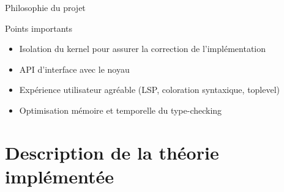 \documentclass[12pt, aspectratio=169]{beamer}
\begin{document}
        \begin{frame}{Philosophie du projet}
            
            \begin{alertblock}{Points importants}
                
                \begin{itemize}
                    \item Isolation du kernel pour assurer la correction de l'implémentation \pause
                    \item API d'interface avec le noyau \pause
                    \item Expérience utilisateur agréable (LSP, coloration syntaxique, toplevel) \pause
                    \item Optimisation mémoire et temporelle du type-checking
                \end{itemize}

            \end{alertblock}

        \end{frame}

    \section{Description de la théorie implémentée}
\end{document}
